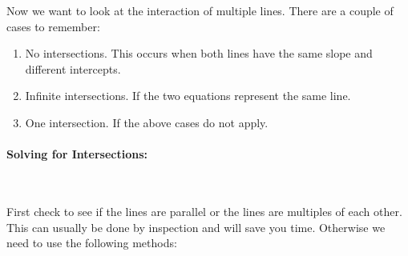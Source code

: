 \documentclass[english,12pt]{article}
\theoremstyle{plain}
\theoremstyle{definition}
\theoremstyle{definition} %
\newcommand{\enum}[1]{\begin{enumerate} #1 \end{enumerate}}
\begin{document}
Now we want to look at the interaction of multiple lines.  There are a couple of cases to remember:
\enum{
\item No intersections.  This occurs when both lines have the same slope and different intercepts.
\item Infinite intersections.  If the two equations represent the same line.
\item One intersection.  If the above cases do not apply.
}

\paragraph{Solving for Intersections:}\

First check to see if the lines are parallel or the lines are multiples of each other.  This can usually be done by inspection and will save you time.  Otherwise we need to use the following methods:
\end{document}

